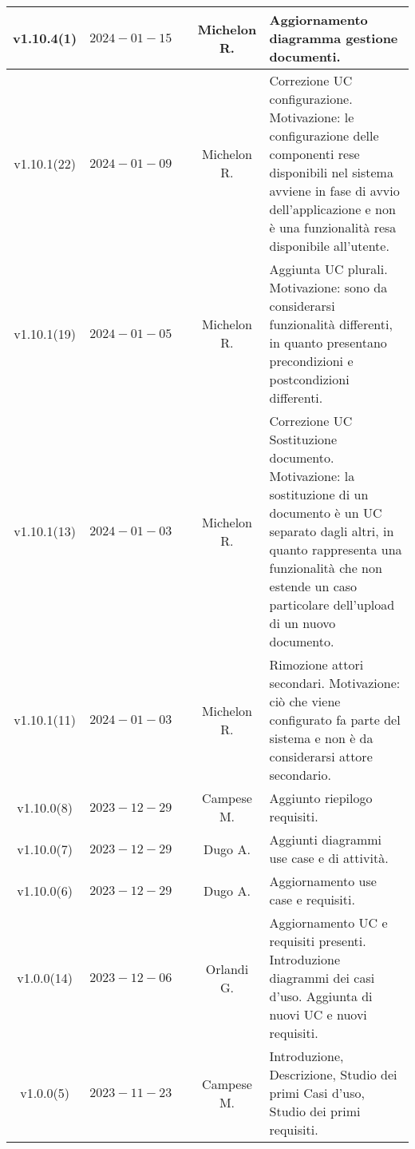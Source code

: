 {\begin{xltabular}{\textwidth}{c|c|c|c|X}
\hline
v1.10.4(1) & $2024-01-15$ &  & Michelon R. & Aggiornamento diagramma gestione documenti.\\
\hline
v1.10.1(22) & $2024-01-09$ &  & Michelon R. & Correzione UC configurazione. Motivazione: le configurazione delle componenti rese disponibili nel sistema avviene in fase di avvio dell'applicazione e non è una funzionalità resa disponibile all'utente.\\
\hline
v1.10.1(19) & $2024-01-05$ &  & Michelon R. & Aggiunta UC plurali. Motivazione: sono da considerarsi funzionalità differenti, in quanto presentano precondizioni e postcondizioni differenti.\\
\hline
v1.10.1(13) & $2024-01-03$ &  & Michelon R. & Correzione UC Sostituzione documento. Motivazione: la sostituzione di un documento è un UC separato dagli altri, in quanto rappresenta una funzionalità che non estende un caso particolare dell'upload di un nuovo documento.\\
\hline
v1.10.1(11) & $2024-01-03$ &  & Michelon R. & Rimozione attori secondari. Motivazione: ciò che viene configurato fa parte del sistema e non è da considerarsi attore secondario.\\
\hline
v1.10.0(8) & $2023-12-29$ &  & Campese M. & Aggiunto riepilogo requisiti.\\
\hline
v1.10.0(7) & $2023-12-29$ &  & Dugo A. & Aggiunti diagrammi use case e di attività.\\
\hline
v1.10.0(6) & $2023-12-29$ &  & Dugo A. & Aggiornamento use case e requisiti.\\
\hline
v1.0.0(14) & $2023-12-06$ &  & Orlandi G. & Aggiornamento UC e requisiti presenti. Introduzione diagrammi dei casi d'uso. Aggiunta di nuovi UC e nuovi requisiti.\\
\hline
v1.0.0(5) & $2023-11-23$ &  & Campese M. & Introduzione, Descrizione, Studio dei primi Casi d'uso, Studio dei primi requisiti.\\

    
\end{xltabular}}